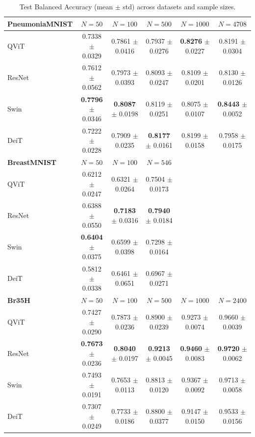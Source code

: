 \begin{table}[htbp]
\centering
\caption{Test Balanced Accuracy (mean $\pm$ std) across datasets and sample sizes.}
\label{tab:test_balacc}
\begin{tabular}{lccccc}
\toprule
\textbf{PneumoniaMNIST} & $N = 50$ & $N = 100$ & $N = 500$ & $N = 1000$ & $N = 4708$ \\
\midrule
QViT & 0.7338 $\pm$ 0.0329 & 0.7861 $\pm$ 0.0416 & 0.7937 $\pm$ 0.0276 & \textbf{0.8276} $\pm$ 0.0227 & 0.8191 $\pm$ 0.0304 \\
ResNet & 0.7612 $\pm$ 0.0562 & 0.7973 $\pm$ 0.0393 & 0.8093 $\pm$ 0.0247 & 0.8109 $\pm$ 0.0201 & 0.8130 $\pm$ 0.0126 \\
Swin & \textbf{0.7796} $\pm$ 0.0346 & \textbf{0.8087} $\pm$ 0.0198 & 0.8119 $\pm$ 0.0251 & 0.8075 $\pm$ 0.0107 & \textbf{0.8443} $\pm$ 0.0052 \\
DeiT & 0.7222 $\pm$ 0.0228 & 0.7909 $\pm$ 0.0235 & \textbf{0.8177} $\pm$ 0.0161 & 0.8199 $\pm$ 0.0158 & 0.7958 $\pm$ 0.0175 \\
\midrule
\textbf{BreastMNIST} & $N = 50$ & $N = 100$ & $N = 546$ &  &  \\
\midrule
QViT & 0.6212 $\pm$ 0.0247 & 0.6321 $\pm$ 0.0264 & 0.7504 $\pm$ 0.0173 &  &  \\
ResNet & 0.6388 $\pm$ 0.0550 & \textbf{0.7183} $\pm$ 0.0316 & \textbf{0.7940} $\pm$ 0.0184 &  &  \\
Swin & \textbf{0.6404} $\pm$ 0.0375 & 0.6599 $\pm$ 0.0398 & 0.7298 $\pm$ 0.0164 &  &  \\
DeiT & 0.5812 $\pm$ 0.0338 & 0.6461 $\pm$ 0.0651 & 0.6967 $\pm$ 0.0271 &  &  \\
\midrule
\textbf{Br35H} & $N = 50$ & $N = 100$ & $N = 500$ & $N = 1000$ & $N = 2400$ \\
\midrule
QViT & 0.7427 $\pm$ 0.0290 & 0.7873 $\pm$ 0.0236 & 0.8900 $\pm$ 0.0239 & 0.9273 $\pm$ 0.0074 & 0.9660 $\pm$ 0.0039 \\
ResNet & \textbf{0.7673} $\pm$ 0.0236 & \textbf{0.8040} $\pm$ 0.0197 & \textbf{0.9213} $\pm$ 0.0045 & \textbf{0.9460} $\pm$ 0.0083 & \textbf{0.9720} $\pm$ 0.0062 \\
Swin & 0.7493 $\pm$ 0.0191 & 0.7653 $\pm$ 0.0113 & 0.8813 $\pm$ 0.0120 & 0.9367 $\pm$ 0.0092 & 0.9713 $\pm$ 0.0058 \\
DeiT & 0.7307 $\pm$ 0.0249 & 0.7733 $\pm$ 0.0186 & 0.8800 $\pm$ 0.0377 & 0.9147 $\pm$ 0.0150 & 0.9533 $\pm$ 0.0156 \\
\bottomrule
\end{tabular}
\end{table}
